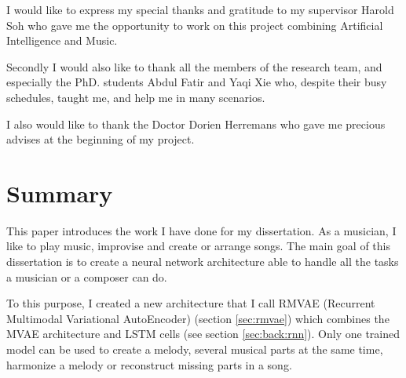 \documentclass[12pt]{report}
\begin{document}
I would like to express my special thanks and gratitude to my supervisor Harold Soh who gave me the opportunity to work on this project combining Artificial Intelligence and Music.

Secondly I would also like to thank all the members of the research team, and especially the PhD. students Abdul Fatir and Yaqi Xie who, despite their busy schedules, taught me, and help me in many scenarios.

I also would like to thank the Doctor Dorien Herremans who gave me precious advises at the beginning of my project.

\newpage
\tableofcontents
\newpage


\setlength{\parindent}{0.6cm}


\chapter*{Summary}

This paper introduces the work I have done for my dissertation.
As a musician, I like to play music, improvise and create or arrange songs.
The main goal of this dissertation is to create a neural network architecture able to handle all the tasks a musician or a composer can do.

To this purpose, I created a new architecture that I call RMVAE (Recurrent Multimodal Variational AutoEncoder) (section \ref{sec:rmvae}) which combines the MVAE architecture \cite{wu_multimodal_2018} and LSTM cells (see section \ref{sec:back:rnn}).
Only one trained model can be used to create a melody, several musical parts at the same time, harmonize a melody or reconstruct missing parts in a song.
\end{document}
